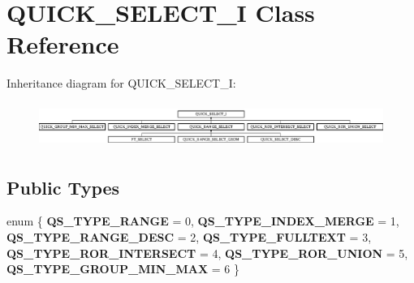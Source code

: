 \hypertarget{classQUICK__SELECT__I}{}\section{Q\+U\+I\+C\+K\+\_\+\+S\+E\+L\+E\+C\+T\+\_\+I Class Reference}
\label{classQUICK__SELECT__I}
Inheritance diagram for Q\+U\+I\+C\+K\+\_\+\+S\+E\+L\+E\+C\+T\+\_\+I\+:\begin{figure}[H]
\begin{center}
\leavevmode
\includegraphics[height=1.473684cm]{classQUICK__SELECT__I}
\end{center}
\end{figure}
\subsection*{Public Types}
\begin{DoxyCompactItemize}
\item 
\mbox{\label{classQUICK__SELECT__I_af70aab538afd22dfd174e24eb133610e}} 
enum \{ \newline
{\bfseries Q\+S\+\_\+\+T\+Y\+P\+E\+\_\+\+R\+A\+N\+GE} = 0, 
{\bfseries Q\+S\+\_\+\+T\+Y\+P\+E\+\_\+\+I\+N\+D\+E\+X\+\_\+\+M\+E\+R\+GE} = 1, 
{\bfseries Q\+S\+\_\+\+T\+Y\+P\+E\+\_\+\+R\+A\+N\+G\+E\+\_\+\+D\+E\+SC} = 2, 
{\bfseries Q\+S\+\_\+\+T\+Y\+P\+E\+\_\+\+F\+U\+L\+L\+T\+E\+XT} = 3, 
\newline
{\bfseries Q\+S\+\_\+\+T\+Y\+P\+E\+\_\+\+R\+O\+R\+\_\+\+I\+N\+T\+E\+R\+S\+E\+CT} = 4, 
{\bfseries Q\+S\+\_\+\+T\+Y\+P\+E\+\_\+\+R\+O\+R\+\_\+\+U\+N\+I\+ON} = 5, 
{\bfseries Q\+S\+\_\+\+T\+Y\+P\+E\+\_\+\+G\+R\+O\+U\+P\+\_\+\+M\+I\+N\+\_\+\+M\+AX} = 6
 \}
\end{DoxyCompactItemize}
